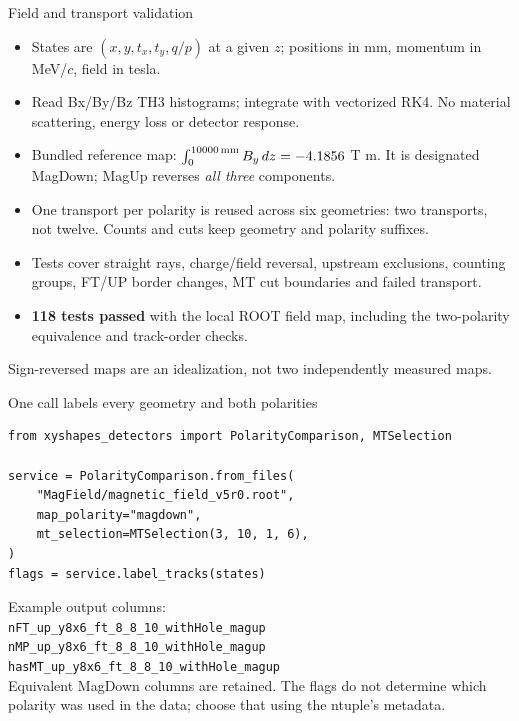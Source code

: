\documentclass[aspectratio=169,10pt]{beamer}
\begin{document}
\begin{frame}{Field and transport validation}
\begin{itemize}
\item States are $(x,y,t_x,t_y,q/p)$ at a given $z$; positions in mm,
momentum in MeV/$c$, field in tesla.
\item Read Bx/By/Bz TH3 histograms; integrate with vectorized RK4.
No material scattering, energy loss or detector response.
\item Bundled reference map: $\int_0^{10000\,\rm mm} B_y\,dz = -4.1856{}$ T m.
It is designated MagDown; MagUp reverses \emph{all three} components.
\item One transport per polarity is reused across six geometries: two transports,
not twelve. Counts and cuts keep geometry and polarity suffixes.
\item Tests cover straight rays, charge/field reversal, upstream exclusions,
counting groups, FT/UP border changes, MT cut boundaries and failed transport.
\item \textbf{118 tests passed} with the local ROOT field map, including the
two-polarity equivalence and track-order checks.
\end{itemize}
\small Sign-reversed maps are an idealization, not two independently measured maps.
\end{frame}

\begin{frame}[fragile]{One call labels every geometry and both polarities}
\begin{verbatim}
from xyshapes_detectors import PolarityComparison, MTSelection

service = PolarityComparison.from_files(
    "MagField/magnetic_field_v5r0.root",
    map_polarity="magdown",
    mt_selection=MTSelection(3, 10, 1, 6),
)
flags = service.label_tracks(states)
\end{verbatim}
\small Example output columns:\\[2mm]
\texttt{nFT\_up\_y8x6\_ft\_8\_8\_10\_withHole\_magup}\\
\texttt{nMP\_up\_y8x6\_ft\_8\_8\_10\_withHole\_magup}\\
\texttt{hasMT\_up\_y8x6\_ft\_8\_8\_10\_withHole\_magup}\\[3mm]
Equivalent MagDown columns are retained. The flags do not determine which
polarity was used in the data; choose that using the ntuple's metadata.
\end{frame}
\end{document}
